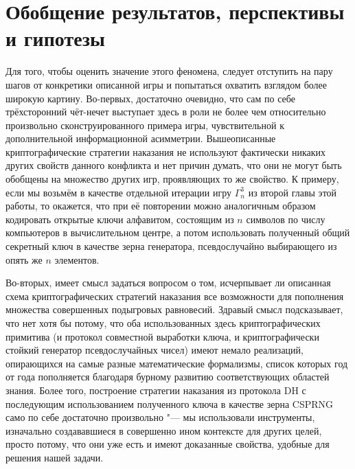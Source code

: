 
\section{Обобщение результатов, перспективы и гипотезы}\label{sec:ch3/sect5}

Для того, чтобы оценить значение этого феномена, следует отступить на пару шагов от конкретики описанной игры и попытаться охватить взглядом более широкую картину. Во-первых, достаточно очевидно, что сам по себе трёхсторонний чёт-нечет выступает здесь в роли не более чем относительно произвольно сконструированного примера игры, чувствительной к дополнительной информационной асимметрии. Вышеописанные криптографические стратегии наказания не используют фактически никаких других свойств данного конфликта и нет причин думать, что они не могут быть обобщены на множество других игр, проявляющих то же свойство. К примеру, если мы возьмём в качестве отдельной итерации игру $\Gamma^3_n$ из второй главы этой работы, то окажется, что при её повторении можно аналогичным образом кодировать открытые ключи алфавитом, состоящим из $n$ символов по числу компьютеров в вычислительном центре, а потом использовать полученный общий секретный ключ в качестве зерна генератора, псевдослучайно выбирающего из опять же $n$ элементов.

Во-вторых, имеет смысл задаться вопросом о том, исчерпывает ли описанная схема криптографических стратегий наказания все возможности для пополнения множества совершенных подыгровых равновесий. Здравый смысл подсказывает, что нет хотя бы потому, что оба использованных здесь криптографических примитива (и протокол совместной выработки ключа, и криптографически стойкий генератор псевдослучайных чисел) имеют немало реализаций, опирающихся на самые разные математические формализмы, список которых год от года пополняется благодаря бурному развитию соответствующих областей знания. Более того, построение стратегии наказания из протокола DH с последующим использованием полученного ключа в качестве зерна CSPRNG само по себе достаточно произвольно "--- мы использовали инструменты, изначально создававшиеся в совершенно ином контексте для других целей, просто потому, что они уже есть и имеют доказанные свойства, удобные для решения нашей задачи.

